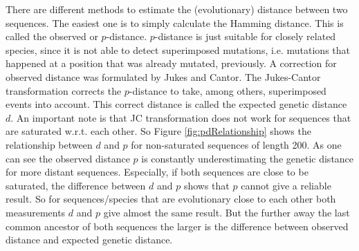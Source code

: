 \documentclass[%
   10pt,              %
   ngerman,           %
   a4paper,           %
   DIV11,             %
]{scrartcl}%
\begin{document}
There are different methods to estimate the (evolutionary) distance between two sequences. The easiest 
one is to simply calculate the Hamming distance. This is called the observed or $p$-distance. $p$-distance 
is just suitable for closely related species, since it is not able to detect superimposed mutations, i.e. 
mutations that happened at a position that was already mutated, previously. A correction for observed 
distance was formulated by Jukes and Cantor. The Jukes-Cantor transformation corrects the $p$-distance 
to take, among others, superimposed events into account. This correct distance is called the expected 
genetic distance $d$. An important note is that JC transformation does 
not work for sequences that are saturated w.r.t. each other. So Figure \ref{fig:pdRelationship} shows 
the relationship between $d$ and $p$ for non-saturated sequences of length 200. As one can see the 
observed distance $p$ is constantly underestimating the genetic distance for more distant sequences. 
Especially, if both sequences are close to be saturated, the difference between $d$ and $p$ shows 
that $p$ cannot give a reliable result. So for sequences/species that are evolutionary close to each 
other both measurements $d$ and $p$ give almost the same result. But the further away the last common 
ancestor of both sequences the larger is the difference between observed distance and expected genetic 
distance. 

%	
\end{document}
